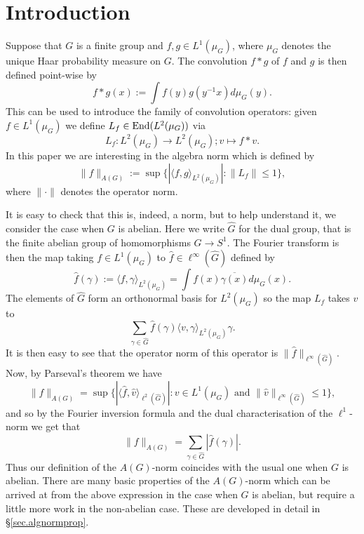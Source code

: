 \documentclass[12pt]{amsart}
\numberwithin{equation}{section}
\theoremstyle{plain}
\theoremstyle{definition}
\renewcommand{\leq}{\leqslant}
\providecommand{\End}{\mathop{\rm End}\nolimits}
\newcommand{\wh}{\widehat}
\begin{document}
\maketitle

\section{Introduction}

Suppose that $G$ is a finite group and $f,g \in L^1(\mu_G)$, where $\mu_G$ denotes the unique Haar probability measure on $G$.  The convolution $f \ast g$ of $f$ and $g$ is then defined point-wise by
\begin{equation*}
f \ast g(x):=\int{f(y)g(y^{-1}x)d\mu_G(y)}.
\end{equation*}
This can be used to introduce the family of convolution operators: given $f \in L^1(\mu_G)$ we define $L_f \in \End(L^2(\mu_G))$ via
\begin{equation*}
L_f:L^2(\mu_G) \rightarrow L^2(\mu_G); v \mapsto f \ast v.
\end{equation*}
In this paper we are interesting in the algebra norm which is defined by
\begin{equation*}
\|f\|_{A(G)} := \sup\{|\langle f,g\rangle_{L^2(\mu_G)}|: \|L_f\| \leq 1\},
\end{equation*}
where $\|\cdot\|$ denotes the operator norm.

It is easy to check that this is, indeed, a norm, but to help understand it, we consider the case when $G$ is abelian.  Here we write $\wh{G}$ for the dual group, that is the finite abelian group of homomorphisms $G \rightarrow S^1$. The Fourier transform is then the map taking $f \in L^1(\mu_G)$ to $\wh{f} \in \ell^\infty(\wh{G})$ defined by
\begin{equation*}
\wh{f}(\gamma):=\langle f,\gamma\rangle_{L^2(\mu_G)} = \int{f(x)\overline{\gamma(x)}d\mu_G(x)}.
\end{equation*}
The elements of $\wh{G}$ form an orthonormal basis for $L^2(\mu_G)$ so the map $L_f$ takes $v$ to 
\begin{equation*}
\sum_{\gamma \in \wh{G}}{\wh{f}(\gamma)\langle v,\gamma\rangle_{L^2(\mu_G)}\gamma}.
\end{equation*}
It is then easy to see that the operator norm of this operator is $\|\wh{f}\|_{\ell^\infty(\wh{G})}$. Now, by Parseval's theorem we have
\begin{equation*}
\|f\|_{A(G)} = \sup\{|\langle \wh{f},\wh{v}\rangle_{\ell^2(\wh{G})}|:v \in L^1(\mu_G) \textrm{ and }\|\wh{v}\|_{\ell^\infty(\wh{G})}\leq 1\} ,
\end{equation*}
and so by the Fourier inversion formula and the dual characterisation of the $\ell^1$-norm we get that
\begin{equation*}
\|f\|_{A(G)} =\sum_{\gamma \in \wh{G}}{|\wh{f}(\gamma)|}.
\end{equation*}
Thus our definition of the $A(G)$-norm coincides with the usual one when $G$ is abelian.  There are many basic properties of the $A(G)$-norm which can be arrived at from the above expression in the case when $G$ is abelian, but require a little more work in the non-abelian case.  These are developed in detail in \S\ref{sec.algnormprop}.
\end{document}
